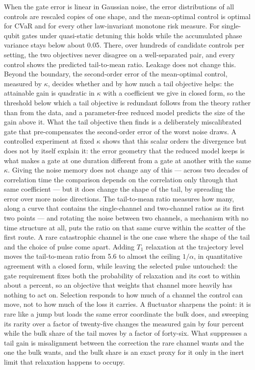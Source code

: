 \documentclass[aps,pra,twocolumn,superscriptaddress,reprint,nofootinbib,floatfix]{revtex4-2}
\theoremstyle{definition}
\begin{document}
When the gate error is linear in Gaussian noise, the error distributions of
all controls are rescaled copies of one shape, and the mean-optimal control is
optimal for CVaR and for every other law-invariant monotone risk measure. For
single-qubit gates under quasi-static detuning this holds while the
accumulated phase variance stays below about 0.05. There, over hundreds of
candidate controls per setting, the two objectives never disagree on a
well-separated pair, and every control shows the predicted tail-to-mean ratio.
Leakage does not change this. Beyond the boundary, the second-order error
of the mean-optimal control, measured by $\kappa$, decides whether and by how
much a tail objective helps: the attainable gain is quadratic in $\kappa$ with
a coefficient we give in closed form, so the threshold below which a tail
objective is redundant follows from the theory rather than from the data, and
a parameter-free reduced model predicts the size of the gain above it. What the tail objective then finds is a deliberately
miscalibrated gate that pre-compensates the second-order error of the worst
noise draws. A controlled experiment at fixed $\kappa$ shows that this scalar
orders the divergence but does not by itself explain it: the error geometry
that the reduced model keeps is what makes a gate at one duration different
from a gate at another with the same $\kappa$. Giving the noise memory does
not change any of this --- across two decades of correlation time the
comparison depends on the correlation only through that same coefficient ---
but it does change the shape of the tail, by spreading the error over more
noise directions. The tail-to-mean ratio measures how many, along a curve
that contains the single-channel and two-channel ratios as its first two
points --- and rotating the noise between two channels, a mechanism with no
time structure at all, puts the ratio on that same curve within the scatter of
the first route. A rare catastrophic channel is the one case where the shape of
the tail and the choice of pulse come apart. Adding $T_1$ relaxation at the
trajectory level moves the tail-to-mean ratio from 5.6 to almost the ceiling
$1/\alpha$, in quantitative agreement with a closed form, while leaving the
selected pulse untouched: the gate requirement fixes both the probability of
relaxation and its cost to within about a percent, so an objective that weights
that channel more heavily has nothing to act on. Selection responds to how much
of a channel the control can move, not to how much of the loss it carries.
A fluctuator sharpens the point: it is rare like a jump but loads the same
error coordinate the bulk does, and sweeping its rarity over a factor of
twenty-five changes the measured gain by four percent while the bulk share of
the tail moves by a factor of forty-six. What suppresses a tail gain is
misalignment between the correction the rare channel wants and the one the
bulk wants, and the bulk share is an exact proxy for it only in the inert
limit that relaxation happens to occupy.
\end{document}
